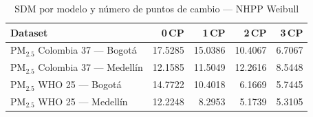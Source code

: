 \begin{table}[htbp]
\centering
\caption{SDM por modelo y n\'{u}mero de puntos de cambio --- NHPP Weibull}
\label{tab:nhpp_sdm}
\begin{tabular}{lrrrr}
\toprule
Dataset & 0\,CP & 1\,CP & 2\,CP & 3\,CP \\
\midrule
PM$_{2.5}$ Colombia 37 --- Bogot\'{a} & 17.5285 & 15.0386 & 10.4067 & 6.7067 \\
PM$_{2.5}$ Colombia 37 --- Medell\'{i}n & 12.1585 & 11.5049 & 12.2616 & 8.5448 \\
PM$_{2.5}$ WHO 25 --- Bogot\'{a} & 14.7722 & 10.4018 & 6.1669 & 5.7445 \\
PM$_{2.5}$ WHO 25 --- Medell\'{i}n & 12.2248 & 8.2953 & 5.1739 & 5.3105 \\
\bottomrule
\end{tabular}
\end{table}
